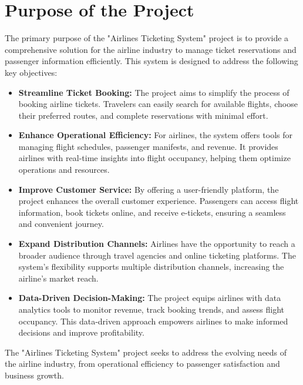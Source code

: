 \section{Purpose of the Project}
The primary purpose of the "Airlines Ticketing System" project is to provide a comprehensive solution for the airline industry to manage ticket reservations and passenger information efficiently. This system is designed to address the following key objectives:

\begin{itemize}
    \item \textbf{Streamline Ticket Booking:} The project aims to simplify the process of booking airline tickets. Travelers can easily search for available flights, choose their preferred routes, and complete reservations with minimal effort.

    \item \textbf{Enhance Operational Efficiency:} For airlines, the system offers tools for managing flight schedules, passenger manifests, and revenue. It provides airlines with real-time insights into flight occupancy, helping them optimize operations and resources.

    \item \textbf{Improve Customer Service:} By offering a user-friendly platform, the project enhances the overall customer experience. Passengers can access flight information, book tickets online, and receive e-tickets, ensuring a seamless and convenient journey.

    \item \textbf{Expand Distribution Channels:} Airlines have the opportunity to reach a broader audience through travel agencies and online ticketing platforms. The system's flexibility supports multiple distribution channels, increasing the airline's market reach.

    \item \textbf{Data-Driven Decision-Making:} The project equips airlines with data analytics tools to monitor revenue, track booking trends, and assess flight occupancy. This data-driven approach empowers airlines to make informed decisions and improve profitability.

\end{itemize}

The "Airlines Ticketing System" project seeks to address the evolving needs of the airline industry, from operational efficiency to passenger satisfaction and business growth.




\clearpage